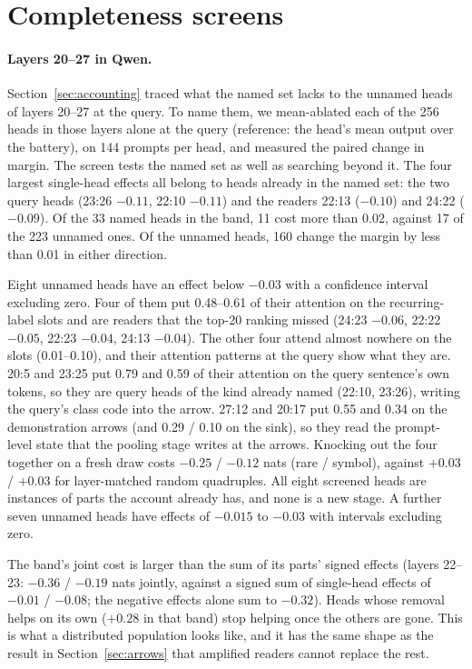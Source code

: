 \documentclass{article}
\begin{document}
\section{Completeness screens}\label{app:complete}
\paragraph{Layers 20--27 in Qwen.} Section~\ref{sec:accounting} traced what the named set lacks to the unnamed heads of layers 20--27 at the query. To name them, we mean-ablated each of the 256 heads in those layers alone at the query (reference: the head's mean output over the battery), on 144 prompts per head, and measured the paired change in margin. The screen tests the named set as well as searching beyond it. The four largest single-head effects all belong to heads already in the named set: the two query heads (23:26 $-0.11$, 22:10 $-0.11$) and the readers 22:13 ($-0.10$) and 24:22 ($-0.09$). Of the 33 named heads in the band, 11 cost more than 0.02, against 17 of the 223 unnamed ones. Of the unnamed heads, 160 change the margin by less than 0.01 in either direction.

Eight unnamed heads have an effect below $-0.03$ with a confidence interval excluding zero. Four of them put 0.48--0.61 of their attention on the recurring-label slots and are readers that the top-20 ranking missed (24:23 $-0.06$, 22:22 $-0.05$, 22:23 $-0.04$, 24:13 $-0.04$). The other four attend almost nowhere on the slots (0.01--0.10), and their attention patterns at the query show what they are. 20:5 and 23:25 put 0.79 and 0.59 of their attention on the query sentence's own tokens, so they are query heads of the kind already named (22:10, 23:26), writing the query's class code into the arrow. 27:12 and 20:17 put 0.55 and 0.34 on the demonstration arrows (and 0.29 / 0.10 on the sink), so they read the prompt-level state that the pooling stage writes at the arrows. Knocking out the four together on a fresh draw costs $-0.25$ / $-0.12$ nats (rare / symbol), against $+0.03$ / $+0.03$ for layer-matched random quadruples. All eight screened heads are instances of parts the account already has, and none is a new stage. A further seven unnamed heads have effects of $-0.015$ to $-0.03$ with intervals excluding zero.

The band's joint cost is larger than the sum of its parts' signed effects (layers 22--23: $-0.36$ / $-0.19$ nats jointly, against a signed sum of single-head effects of $-0.01$ / $-0.08$; the negative effects alone sum to $-0.32$). Heads whose removal helps on its own ($+0.28$ in that band) stop helping once the others are gone. This is what a distributed population looks like, and it has the same shape as the result in Section~\ref{sec:arrows} that amplified readers cannot replace the rest.
\end{document}
